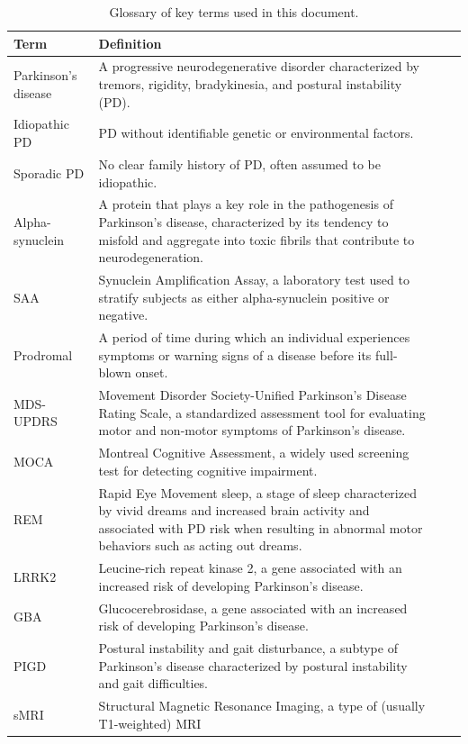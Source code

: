 \documentclass[
  table]{article}
\begin{document}
\begin{table}

\caption{\label{tab:unnamed-chunk-2}Glossary of key terms used in this document.}
\centering
\begin{tabular}[t]{lp{10cm}lp{10cm}}
\toprule
Term & Definition\\
\midrule
Parkinson's disease & A progressive neurodegenerative
 disorder characterized by tremors,
 rigidity, bradykinesia, and postural
 instability (PD).\\
Idiopathic PD & PD without identifiable genetic or
 environmental factors.\\
Sporadic PD & No clear family history of PD, often
 assumed to be idiopathic.\\
Alpha-synuclein & A protein that plays a key role in the
 pathogenesis of Parkinson's disease,
 characterized by its tendency to
 misfold and aggregate into toxic
 fibrils that contribute to
 neurodegeneration.\\
SAA & Synuclein Amplification Assay, a
 laboratory test used to stratify
 subjects as either alpha-synuclein
 positive or negative.\\
\addlinespace
Prodromal & A period of time during which an
 individual experiences symptoms or
 warning signs of a disease before its
 full-blown onset.\\
MDS-UPDRS & Movement Disorder Society-Unified
 Parkinson's Disease Rating Scale, a
 standardized assessment tool for
 evaluating motor and non-motor symptoms
 of Parkinson's disease.\\
MOCA & Montreal Cognitive Assessment, a widely
 used screening test for detecting
 cognitive impairment.\\
REM & Rapid Eye Movement sleep, a stage of
 sleep characterized by vivid dreams and
 increased brain activity and associated
 with PD risk when resulting in abnormal
 motor behaviors such as acting out
 dreams.\\
LRRK2 & Leucine-rich repeat kinase 2, a gene
 associated with an increased risk of
 developing Parkinson's disease.\\
\addlinespace
GBA & Glucocerebrosidase, a gene associated
 with an increased risk of developing
 Parkinson's disease.\\
PIGD & Postural instability and gait
 disturbance, a subtype of Parkinson's
 disease characterized by postural
 instability and gait difficulties.\\
sMRI & Structural Magnetic Resonance Imaging,
 a type of (usually T1-weighted) MRI

\end{tabular}
\end{table}
\end{document}

